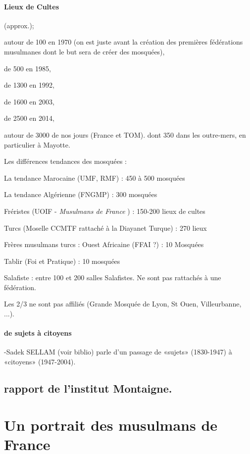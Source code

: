\paragraph{Lieux de Cultes}
 (approx.); 
 \bi
 
\item  autour de 100 en 1970 (on est juste avant la création des premières fédérations musulmanes dont le but sera de créer des mosquées), \item de 500 en 1985, \item de 1300 en 1992, \item de 1600 en 2003, \item de 2500 en 2014, \item autour de 3000 de nos jours (France et TOM). dont 350 dans les outre-mers, en particulier à Mayotte. 
\ei

Les différences tendances des mosquées : 
\bi
\item La tendance Marocaine (UMF, RMF) : 450 à 500 mosquées
\item La tendance Algérienne (FNGMP) : 300 mosquées
\item Fréristes (UOIF - \textit{Musulmans de France} ) : 150-200 lieux de cultes
\item Turcs (Moselle CCMTF rattaché à la Diayanet Turque) : 270 lieux  
\item Frères musulmans turcs :
Ouest Africaine (FFAI ?)  : 10 Mosquées
\item Tablir (Foi et Pratique) : 10 mosquées
\item Salafiste : entre 100 et 200 salles Salafistes. Ne sont pas rattachés à une fédération.
\item Les 2/3 ne sont pas affiliés (Grande Mosquée de Lyon, St Ouen, Villeurbanne, ...). 
\ei


\paragraph{de sujets à citoyens}
-Sadek SELLAM (voir biblio) parle d’un passage de «sujets» (1830-1947) à «citoyens» (1947-2004).


\subsection{ rapport de l'institut Montaigne. }

\section{Un portrait des musulmans de France}


